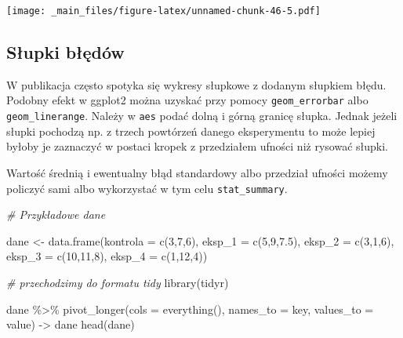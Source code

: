 \documentclass[
]{book}
\newenvironment{Shaded}{\begin{snugshade}}{\end{snugshade}}
\newcommand{\AttributeTok}[1]{\textcolor[rgb]{0.77,0.63,0.00}{#1}}
\newcommand{\CommentTok}[1]{\textcolor[rgb]{0.56,0.35,0.01}{\textit{#1}}}
\newcommand{\DecValTok}[1]{\textcolor[rgb]{0.00,0.00,0.81}{#1}}
\newcommand{\FloatTok}[1]{\textcolor[rgb]{0.00,0.00,0.81}{#1}}
\newcommand{\FunctionTok}[1]{\textcolor[rgb]{0.00,0.00,0.00}{#1}}
\newcommand{\NormalTok}[1]{#1}
\newcommand{\OtherTok}[1]{\textcolor[rgb]{0.56,0.35,0.01}{#1}}
\newcommand{\SpecialCharTok}[1]{\textcolor[rgb]{0.00,0.00,0.00}{#1}}
\newcommand{\StringTok}[1]{\textcolor[rgb]{0.31,0.60,0.02}{#1}}
\begin{document}
\texttt{[image: \_main\_files/figure-latex/unnamed-chunk-46-5.pdf]}

\hypertarget{sux142upki-bux142ux119duxf3w}{%
\subsection{Słupki błędów}\label{sux142upki-bux142ux119duxf3w}}

W publikacja często spotyka się wykresy słupkowe z dodanym słupkiem błędu. Podobny efekt w ggplot2 można uzyskać przy pomocy \texttt{geom\_errorbar} albo \texttt{geom\_linerange}. Należy w \texttt{aes} podać dolną i górną granicę słupka. Jednak jeżeli słupki pochodzą np. z trzech powtórzeń danego eksperymentu to może lepiej byłoby je zaznaczyć w postaci kropek z przedziałem ufności niż rysować słupki.

Wartość średnią i ewentualny błąd standardowy albo przedział ufności możemy policzyć sami albo wykorzystać w tym celu \texttt{stat\_summary}.

\begin{Shaded}
\begin{Highlighting}[]
\CommentTok{\# Przykładowe dane}

\NormalTok{dane }\OtherTok{\textless{}{-}} \FunctionTok{data.frame}\NormalTok{(}\AttributeTok{kontrola =} \FunctionTok{c}\NormalTok{(}\DecValTok{3}\NormalTok{,}\DecValTok{7}\NormalTok{,}\DecValTok{6}\NormalTok{), }\AttributeTok{eksp\_1 =} \FunctionTok{c}\NormalTok{(}\DecValTok{5}\NormalTok{,}\DecValTok{9}\NormalTok{,}\FloatTok{7.5}\NormalTok{), }\AttributeTok{eksp\_2 =} \FunctionTok{c}\NormalTok{(}\DecValTok{3}\NormalTok{,}\DecValTok{1}\NormalTok{,}\DecValTok{6}\NormalTok{), }\AttributeTok{eksp\_3 =} \FunctionTok{c}\NormalTok{(}\DecValTok{10}\NormalTok{,}\DecValTok{11}\NormalTok{,}\DecValTok{8}\NormalTok{), }\AttributeTok{eksp\_4 =} \FunctionTok{c}\NormalTok{(}\DecValTok{1}\NormalTok{,}\DecValTok{12}\NormalTok{,}\DecValTok{4}\NormalTok{))}

\CommentTok{\# przechodzimy do formatu tidy}
\FunctionTok{library}\NormalTok{(tidyr)}

\NormalTok{dane }\SpecialCharTok{\%\textgreater{}\%} \FunctionTok{pivot\_longer}\NormalTok{(}\AttributeTok{cols =} \FunctionTok{everything}\NormalTok{(), }\AttributeTok{names\_to =} \StringTok{\textquotesingle{}key\textquotesingle{}}\NormalTok{, }\AttributeTok{values\_to =} \StringTok{\textquotesingle{}value\textquotesingle{}}\NormalTok{) }\OtherTok{{-}\textgreater{}}\NormalTok{ dane}
\FunctionTok{head}\NormalTok{(dane)}
\end{Highlighting}
\end{Shaded}
\end{document}
